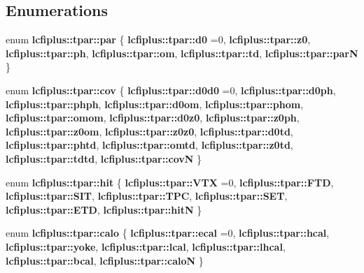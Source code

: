 \subsection*{Enumerations}
\begin{DoxyCompactItemize}
\item 
enum \textbf{ lcfiplus\+::tpar\+::par} \{ \newline
\textbf{ lcfiplus\+::tpar\+::d0} =0, 
\textbf{ lcfiplus\+::tpar\+::z0}, 
\textbf{ lcfiplus\+::tpar\+::ph}, 
\textbf{ lcfiplus\+::tpar\+::om}, 
\newline
\textbf{ lcfiplus\+::tpar\+::td}, 
\textbf{ lcfiplus\+::tpar\+::parN}
 \}
\item 
enum \textbf{ lcfiplus\+::tpar\+::cov} \{ \newline
\textbf{ lcfiplus\+::tpar\+::d0d0} =0, 
\textbf{ lcfiplus\+::tpar\+::d0ph}, 
\textbf{ lcfiplus\+::tpar\+::phph}, 
\textbf{ lcfiplus\+::tpar\+::d0om}, 
\newline
\textbf{ lcfiplus\+::tpar\+::phom}, 
\textbf{ lcfiplus\+::tpar\+::omom}, 
\textbf{ lcfiplus\+::tpar\+::d0z0}, 
\textbf{ lcfiplus\+::tpar\+::z0ph}, 
\newline
\textbf{ lcfiplus\+::tpar\+::z0om}, 
\textbf{ lcfiplus\+::tpar\+::z0z0}, 
\textbf{ lcfiplus\+::tpar\+::d0td}, 
\textbf{ lcfiplus\+::tpar\+::phtd}, 
\newline
\textbf{ lcfiplus\+::tpar\+::omtd}, 
\textbf{ lcfiplus\+::tpar\+::z0td}, 
\textbf{ lcfiplus\+::tpar\+::tdtd}, 
\textbf{ lcfiplus\+::tpar\+::covN}
 \}
\item 
enum \textbf{ lcfiplus\+::tpar\+::hit} \{ \newline
\textbf{ lcfiplus\+::tpar\+::\+V\+TX} =0, 
\textbf{ lcfiplus\+::tpar\+::\+F\+TD}, 
\textbf{ lcfiplus\+::tpar\+::\+S\+IT}, 
\textbf{ lcfiplus\+::tpar\+::\+T\+PC}, 
\newline
\textbf{ lcfiplus\+::tpar\+::\+S\+ET}, 
\textbf{ lcfiplus\+::tpar\+::\+E\+TD}, 
\textbf{ lcfiplus\+::tpar\+::hitN}
 \}
\item 
enum \textbf{ lcfiplus\+::tpar\+::calo} \{ \newline
\textbf{ lcfiplus\+::tpar\+::ecal} =0, 
\textbf{ lcfiplus\+::tpar\+::hcal}, 
\textbf{ lcfiplus\+::tpar\+::yoke}, 
\textbf{ lcfiplus\+::tpar\+::lcal}, 
\newline
\textbf{ lcfiplus\+::tpar\+::lhcal}, 
\textbf{ lcfiplus\+::tpar\+::bcal}, 
\textbf{ lcfiplus\+::tpar\+::caloN}
 \}
\end{DoxyCompactItemize}
